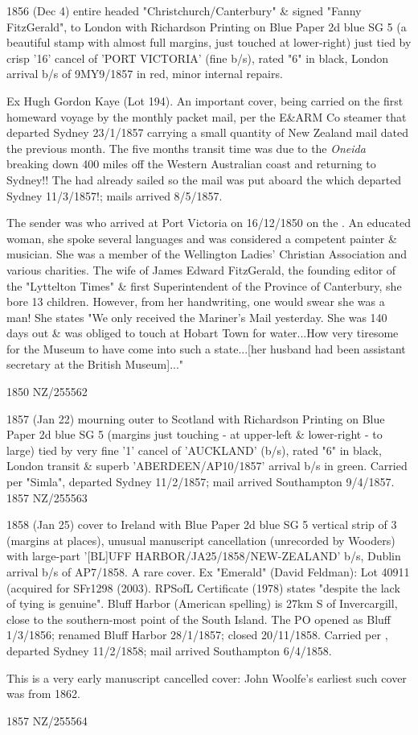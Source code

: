 \documentclass[justified]{tufte-book}
\begin{document}
%
{1856 (Dec 4) entire headed "Christchurch/Canterbury" \& signed "Fanny FitzGerald", to London with Richardson Printing on Blue Paper 2d blue SG 5 (a beautiful stamp with almost full margins, just touched at lower-right) just tied by crisp '16' cancel of 'PORT VICTORIA' (fine b/s), rated "6" in black, London arrival b/s of 9MY9/1857 in red, minor internal repairs. 

Ex Hugh Gordon Kaye (Lot 194). An important cover, being carried on the first homeward voyage by the monthly packet mail, per the E\&ARM Co steamer  that departed Sydney 23/1/1857 carrying a small quantity of New Zealand mail dated the previous month. The five months transit time was due to the \textit{Oneida} breaking down 400 miles off the Western Australian coast and returning to Sydney!! The  had already sailed so the mail was put aboard the  which departed Sydney 11/3/1857!; mails arrived 8/5/1857.

The sender was  who arrived at Port Victoria on 16/12/1850 on the . An educated woman, she spoke several languages and was considered a competent painter \& musician. She was a member of the Wellington Ladies' Christian Association and various charities. The wife of James Edward FitzGerald, the founding editor of the "Lyttelton Times" \& first Superintendent of the Province of Canterbury, she bore 13 children. However, from her handwriting, one would swear she was a man! She states "We only received the Mariner's Mail yesterday. She was 140 days out \& was obliged to touch at Hobart Town for water...How very tiresome for the Museum to have come into such a state...[her husband had been assistant secretary at the British Museum]..."}%
{1850}%
{NZ/255562}%
{}%
{}
{}%
{}%

%
{1857 (Jan 22) mourning outer to Scotland with Richardson Printing on Blue Paper 2d blue SG 5 (margins just touching - at upper-left \& lower-right - to large) tied by very fine '1' cancel of 'AUCKLAND' (b/s), rated "6" in black, London transit \& superb 'ABERDEEN/AP10/1857' arrival b/s in green. Carried per "Simla", departed Sydney 11/2/1857; mail arrived Southampton 9/4/1857. }%
{1857}%
{NZ/255563}%
{}%
{}
{}%
{}%

%
{1858 (Jan 25) cover to Ireland with Blue Paper 2d blue SG 5 vertical strip of 3 (margins at places), unusual manuscript cancellation (unrecorded by Wooders) with large-part '[BL]UFF HARBOR/JA25/1858/NEW-ZEALAND' b/s, Dublin arrival b/s of AP7/1858. A rare cover. Ex "Emerald" (David Feldman): Lot 40911 (acquired for SFr1298 (2003). RPSofL Certificate (1978) states "despite the lack of tying is genuine". Bluff Harbor (American spelling) is 27km S of Invercargill, close to the southern-most point of the South Island. The PO opened as Bluff 1/3/1856; renamed Bluff Harbor 28/1/1857; closed 20/11/1858. Carried per , departed Sydney 11/2/1858; mail arrived Southampton 6/4/1858. 

This is a very early manuscript cancelled cover: John Woolfe's earliest such cover was from 1862.}%
{1857}%
{NZ/255564}%
{}%
{}
{}%
{}%
\end{document}
